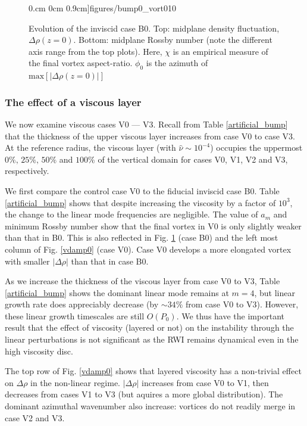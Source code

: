 \begin{figure}
     0.cm 0cm
     0.9cm]{figures/bump0_vort010}
  \caption{Evolution of the inviscid case B0. Top: midplane density fluctuation, 
    $\Delta\rho(z=0)$. Bottom: midplane
    Rossby number (note the different axis range from the top plots). 
    Here, $\chi$ is an empirical measure of the final vortex
    aspect-ratio. $\phi_0$ is the azimuth of 
    $\mathrm{max}\left[|\Delta\rho(z=0)|\right]$
    \label{bump0_bump1}}
\end{figure}

\subsubsection{The effect of a viscous layer}
We now examine viscous cases V0 --- V3. Recall  
from Table \ref{artificial_bump} that the 
thickness of the upper viscous layer increases from case V0 to case
V3. At the reference radius, the viscous layer (with $
\hat{\nu}\sim10^{-4}$) occupies the uppermost $0\%,\,25\%,\,50\%$ and
$100\%$ of the vertical domain for cases V0, V1, V2 and V3,
respectively.    

We first compare the control case V0 to the fiducial
inviscid case B0. Table \ref{artificial_bump} shows that despite
increasing the viscosity by a factor of $10^3$, the change to the
linear mode frequencies are negligible. 
The value of $a_m$ and minimum Rossby number show that the final
vortex in V0 is only slightly weaker than that in B0. This is also
reflected in  Fig. \ref{bump0_bump1} (case B0) and the left most column of
Fig. \ref{vdamp0} (case V0). Case V0 develops a more elongated 
vortex with smaller $|\Delta\rho|$ than that in case B0. 
  
As we increase the thickness of the viscous layer from case V0 to V3, 
Table \ref{artificial_bump} shows the dominant linear mode remains at
$m=4$, but linear growth rate does appreciably decrease 
(by $\sim 34\%$ from case V0 to V3). However, these linear growth timescales
are still $O(P_0)$.  
We thus have the important result that the effect of viscosity
(layered or not) on the
instability through the linear perturbations is not significant as the
RWI remains dynamical even in the high viscosity disc.   %

The top row of Fig. \ref{vdamp0} shows that layered viscosity has a
non-trivial effect on $\Delta\rho$ in the
non-linear regime. $|\Delta \rho|$ increases
from case V0 to V1, then decreases from cases V1 to V3 (but aquires a
more global distribution). The dominant azimuthal wavenumber also
increase: vortices do not readily merge in case V2 and V3. 
 
